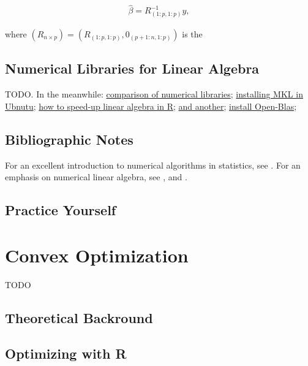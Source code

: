 \documentclass[]{book}
\theoremstyle{definition}
\theoremstyle{definition}
\theoremstyle{definition}
\theoremstyle{remark}
\begin{document}
\begin{align*}
  \hat \beta = R_{(1:p,1:p)}^{-1} y,
\end{align*}

where \((R_{n\times p})=(R_{(1:p,1:p)},0_{(p+1:n,1:p)})\) is the

\section{Numerical Libraries for Linear
Algebra}\label{numerical-libraries-for-linear-algebra}

TODO. In the meanwhile:
\href{https://en.wikipedia.org/wiki/Comparison_of_linear_algebra_libraries}{comparison
of numerical libraries};
\href{http://dirk.eddelbuettel.com/blog/2018/04/15/\#018_mkl_for_debian_ubuntu}{installing
MKL in Ubnutu};
\href{https://www.r-bloggers.com/why-is-r-slow-some-explanations-and-mklopenblas-setup-to-try-to-fix-this/}{how
to speed-up linear algebra in R};
\href{https://www.r-bloggers.com/for-faster-r-use-openblas-instead-better-than-atlas-trivial-to-switch-to-on-ubuntu/}{and
another};
\href{https://gist.github.com/pachamaltese/e4b819ccf537d465a8d49e6d60252d89}{install
Open-Blas};

\section{Bibliographic Notes}\label{bibliographic-notes-14}

For an excellent introduction to numerical algorithms in statistics, see
\citet{weihs2013foundations}. For an emphasis on numerical linear
algebra, see \citet{gentle2012numerical}, and \citet{golub2012matrix}.

\section{Practice Yourself}\label{practice-yourself-13}

\chapter{Convex Optimization}\label{convex}

TODO

\section{Theoretical Backround}\label{theoretical-backround}

\section{Optimizing with R}\label{optimizing-with-r}
\end{document}
